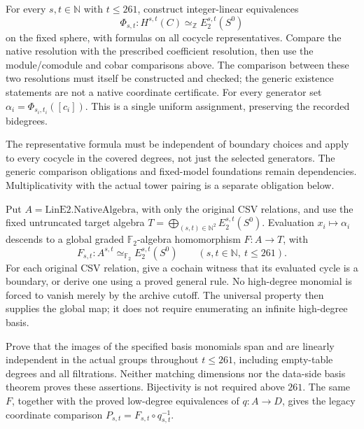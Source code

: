 \begin{proposition}
  \label{prop:lin-native-actual-comparison}
  \notready
  For every $s,t\in\mathbb N$ with $t\le261$, construct integer-linear
  equivalences
  \[
    \Phi_{s,t}:H^{s,t}(C)\simeq_{\mathbb Z}E_2^{s,t}(S^0)
  \]
  on the fixed sphere, with formulas on all cocycle representatives.
  Compare the native resolution with the prescribed coefficient resolution,
  then use the module/comodule and cobar comparisons above. The comparison
  between these two resolutions must itself be constructed and checked;
  the generic existence statements are not a native coordinate certificate.
  For every generator set $\alpha_i=\Phi_{s_i,t_i}([c_i])$.
  This is a single uniform assignment, preserving the recorded bidegrees.

  The representative formula must be independent of boundary choices and
  apply to every cocycle in the covered degrees, not just the selected
  generators. The generic comparison obligations and fixed-model
  foundations remain dependencies. Multiplicativity with the actual tower
  pairing is a separate obligation below.
\end{proposition}

\begin{proposition}
  \label{prop:lin-native-quotient-comparison}
  \notready
  Put $A=\mathrm{LinE2.NativeAlgebra}$, with only the original CSV
  relations, and use the fixed untruncated target algebra
  $T=\bigoplus_{(s,t)\in\mathbb N^2}E_2^{s,t}(S^0)$.
  Evaluation $x_i\mapsto\alpha_i$ descends to a global graded
  $\mathbb F_2$-algebra homomorphism $F:A\to T$, with
  \[
    F_{s,t}:A^{s,t}\simeq_{\mathbb F_2}E_2^{s,t}(S^0)
      \qquad(s,t\in\mathbb N,\ t\le261).
  \]
  For each original CSV relation, give a cochain witness that its
  evaluated cycle is a boundary, or derive one using a proved general
  rule. No high-degree monomial is forced to vanish merely by the
  archive cutoff. The universal property then supplies the global map;
  it does not require enumerating an infinite high-degree basis.

  Prove that the images of the specified basis monomials span and are
  linearly independent in the actual groups throughout $t\le261$,
  including empty-table degrees and all filtrations. Neither matching
  dimensions nor the data-side basis theorem proves these assertions.
  Bijectivity is not required above $261$. The same $F$, together with
  the proved low-degree equivalences of $q:A\to D$, gives the legacy
  coordinate comparison $P_{s,t}=F_{s,t}\circ q_{s,t}^{-1}$.
\end{proposition}

